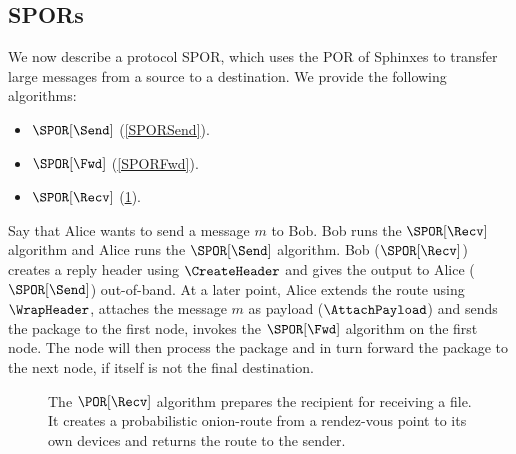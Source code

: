 
\subsection{\Acfp*{SPOR}}%
\label{sec:message_passing}


We now describe a protocol \ac{SPOR}, which uses the \ac{POR} of Sphinxes to 
transfer large messages from a source to a destination.
We provide the following algorithms:
\begin{itemize}
  \item \(\SPOR[\Send]\) (\cref{SPORSend}).
  \item \(\SPOR[\Fwd]\) (\cref{SPORFwd}).
  \item \(\SPOR[\Recv]\) (\cref{SPORRecv}).
\end{itemize}

Say that Alice wants to send a message \(m\) to Bob.
Bob runs the \(\SPOR[\Recv]\) algorithm and Alice runs the \(\SPOR[\Send]\) 
algorithm.
Bob (\ie \(\SPOR[\Recv]\)) creates a reply header using \(\CreateHeader\) and 
gives the output to Alice (\ie \(\SPOR[\Send]\)) out-of-band.
At a later point, Alice extends the route using \(\WrapHeader\), attaches the 
message \(m\) as payload (\(\AttachPayload\)) and sends the package to the 
first node, \ie invokes the \(\SPOR[\Fwd]\) algorithm on the first node.
The node will then process the package and in turn forward the package to the 
next node, if itself is not the final destination.


\begin{figure}
  \caption{\label{SPORRecv}%
    The \(\POR[\Recv]\) algorithm prepares the recipient for receiving a file.
    It creates a probabilistic onion-route from a rendez-vous point to its own 
    devices and returns the route to the sender.
  }
\end{figure}

